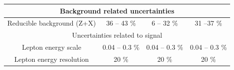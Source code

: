 \begin{table}[!htb]
\begin{center}
\begin{tabular}{|c|c|c|c|}
                        \hline %
                        \hline %
                        \multicolumn{4}{|c|}{Background related uncertainties} \\
                        \hline %
                        Reducible background (Z+X) & 36 -- 43 \% & 6 -- 32 \%  & 31 --37 \% \\  
                        \hline %
                        \hline %
                        \multicolumn{4}{|c|}{Uncertainties related to signal} \\
                        \hline %
                        Lepton energy scale & 0.04 -- 0.3 \% & 0.04 -- 0.3 \% & 0.04 -- 0.3 \% \\  
                        Lepton energy resolution & 20 \% & 20 \%  & 20 \% \\  
                        \hline %
                        \hline %
                \end{tabular}
                \normalsize
        \end{center}
\end{table}
\\

